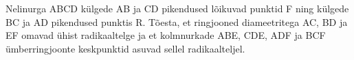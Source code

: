 \documentclass[a4paper,11pt,twocolumn]{article}
\begin{document}
\begin{question}
	Nelinurga ABCD külgede AB ja CD pikendused lõikuvad punktid F ning külgede BC ja AD pikendused punktis R. Tõesta, et ringjooned diameetritega AC, BD ja EF omavad ühist radikaaltelge ja et kolmnurkade ABE, CDE, ADF ja BCF ümberringjoonte keskpunktid asuvad sellel radikaalteljel.
\end{question}
\end{document}
